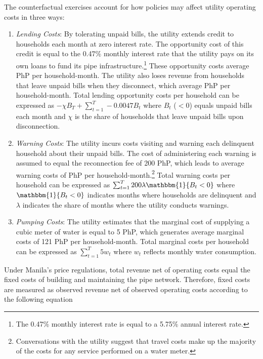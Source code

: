 \documentclass[12pt,table]{article}
\begin{document}
The counterfactual exercises account for how policies may affect utility operating costs in three ways:
\begin{enumerate}
	\item \textit{Lending Costs}:  By tolerating unpaid bills, the utility extends credit to households each month at zero interest rate.  The opportunity cost of this credit is equal to the 0.47\% monthly interest rate that the utility pays on its own loans to fund its pipe infrastructure.\footnote{The 0.47\% monthly interest rate is equal to a 5.75\% annual interest rate.}  These opportunity costs average PhP per household-month.  The utility also loses revenue from households that leave unpaid bills when they disconnect, which average PhP per household-month.  Total lending opportunity costs per household can be expressed as $ - \chi B_T + \sum_{t=1}^{T}  - 0.0047 B_t $ where $B_t$ ($<0$) equals unpaid bills each month and $\chi$ is the share of households that leave unpaid bills upon disconnection.

	\item \textit{Warning Costs}:  The utility incurs costs visiting and warning each delinquent household about their unpaid bills.  The cost of administering each warning is assumed to equal the reconnection fee of 200 PhP, which leads to average warning costs of PhP per household-month.\footnote{Conversations with the utility suggest that travel costs make up the majority of the costs for any service performed on a water meter.}  Total warning costs per household can be expressed as  $\sum_{t=1}^{T} 200 \lambda \mathbbm{1}\{B_t < 0 \}  $ where $ \mathbbm{1}\{B_t < 0 \}$ indicates months where households are delinquent and $\lambda$ indicates the share of months where the utility conducts warnings.

	\item \textit{Pumping Costs}: The utility estimates that the marginal cost of supplying a cubic meter of water is equal to 5 PhP, which generates average marginal costs of 121 PhP per household-month.  Total marginal costs per household can be expressed as $\sum_{t=1}^{T} 5 w_t  $ where $w_t$ reflects monthly water consumption.
\end{enumerate}
Under Manila's price regulations, total revenue net of operating costs equal the fixed costs of building and maintaining the pipe network.  Therefore, fixed costs are measured as observed revenue net of observed operating costs according to the following equation
\end{document}

